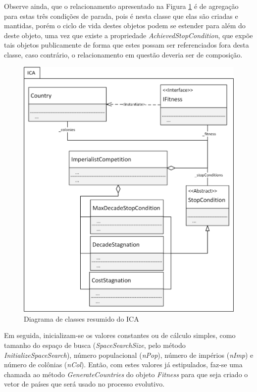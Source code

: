 Observe ainda, que o relacionamento apresentado na Figura \ref{fig:ClassesICA-ICAResumed} é de agregação para estas três condições de parada, pois é nesta classe que elas são criadas e mantidas, porém o ciclo de vida destes objetos podem se estender para além do deste objeto, uma vez que existe a propriedade \emph{AchievedStopCondition}, que expõe tais objetos publicamente de forma que estes possam ser referenciados fora desta classe, caso contrário, o relacionamento em questão deveria ser de composição.

\begin{figure}[h]
	\centering	
	\includegraphics[scale=0.9]{Figuras/ClassesICA-ICAResumed.png}
	\caption{Diagrama de classes resumido do ICA }
	\label{fig:ClassesICA-ICAResumed}
	\end{figure}
    
Em seguida, inicializam-se os valores constantes ou de cálculo simples, como tamanho do espaço de busca (\emph{SpaceSearchSize}, pelo método \emph{InitializeSpaceSearch}), número populacional (\emph{nPop}), número de impérios (\emph{nImp}) e número de colônias (\emph{nCol}). Então, com estes valores já estipulados, faz-se uma chamada ao método \emph{GenerateCountries} do objeto \emph{Fitness} para que seja criado o vetor de países que será usado no processo evolutivo.

